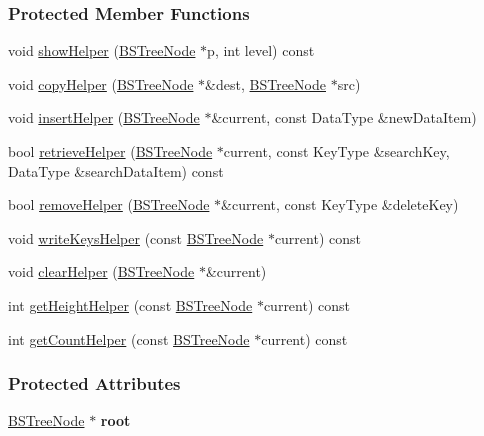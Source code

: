 \subsubsection*{Protected Member Functions}
\begin{DoxyCompactItemize}
\item 
void \hyperlink{class_b_s_tree_a44b3002e3476eb410468a4b9aaaa73ef}{show\+Helper} (\hyperlink{class_b_s_tree_1_1_b_s_tree_node}{B\+S\+Tree\+Node} $\ast$p, int level) const 
\item 
void \hyperlink{class_b_s_tree_a7dafca77e4a0a85c77ca0bbfec84c95f}{copy\+Helper} (\hyperlink{class_b_s_tree_1_1_b_s_tree_node}{B\+S\+Tree\+Node} $\ast$\&dest, \hyperlink{class_b_s_tree_1_1_b_s_tree_node}{B\+S\+Tree\+Node} $\ast$src)
\item 
void \hyperlink{class_b_s_tree_a1e715071d157b7c8b04f04df2c1ced66}{insert\+Helper} (\hyperlink{class_b_s_tree_1_1_b_s_tree_node}{B\+S\+Tree\+Node} $\ast$\&current, const Data\+Type \&new\+Data\+Item)
\item 
bool \hyperlink{class_b_s_tree_a75bd589d6babb4d87c33c1f62efbf4bf}{retrieve\+Helper} (\hyperlink{class_b_s_tree_1_1_b_s_tree_node}{B\+S\+Tree\+Node} $\ast$current, const Key\+Type \&search\+Key, Data\+Type \&search\+Data\+Item) const 
\item 
bool \hyperlink{class_b_s_tree_a12d20a0b95e369f9e6dd0c1cf8046655}{remove\+Helper} (\hyperlink{class_b_s_tree_1_1_b_s_tree_node}{B\+S\+Tree\+Node} $\ast$\&current, const Key\+Type \&delete\+Key)
\item 
void \hyperlink{class_b_s_tree_a157fbdcc8b75f8ca8186e7c0e47abcb8}{write\+Keys\+Helper} (const \hyperlink{class_b_s_tree_1_1_b_s_tree_node}{B\+S\+Tree\+Node} $\ast$current) const 
\item 
void \hyperlink{class_b_s_tree_a9ba664bd491c842d38b62939087da0b6}{clear\+Helper} (\hyperlink{class_b_s_tree_1_1_b_s_tree_node}{B\+S\+Tree\+Node} $\ast$\&current)
\item 
int \hyperlink{class_b_s_tree_ae06bf34af09efb93e92991bf2cc2d14a}{get\+Height\+Helper} (const \hyperlink{class_b_s_tree_1_1_b_s_tree_node}{B\+S\+Tree\+Node} $\ast$current) const 
\item 
int \hyperlink{class_b_s_tree_ace1900579bd13cd48ed08982e32cdb90}{get\+Count\+Helper} (const \hyperlink{class_b_s_tree_1_1_b_s_tree_node}{B\+S\+Tree\+Node} $\ast$current) const 
\end{DoxyCompactItemize}
\subsubsection*{Protected Attributes}
\begin{DoxyCompactItemize}
\item 
\hyperlink{class_b_s_tree_1_1_b_s_tree_node}{B\+S\+Tree\+Node} $\ast$ {\bfseries root}\hypertarget{class_b_s_tree_a83534afce9094181ac031f9f596a8625}{}\label{class_b_s_tree_a83534afce9094181ac031f9f596a8625}

\end{DoxyCompactItemize}


